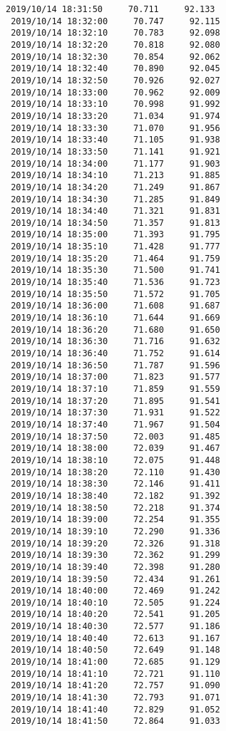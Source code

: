 \documentclass[11pt]{article}
\begin{document}
\begin{Verbatim}[commandchars=\\\{\}]
 2019/10/14 18:31:50     70.711     92.133
 2019/10/14 18:32:00     70.747     92.115
 2019/10/14 18:32:10     70.783     92.098
 2019/10/14 18:32:20     70.818     92.080
 2019/10/14 18:32:30     70.854     92.062
 2019/10/14 18:32:40     70.890     92.045
 2019/10/14 18:32:50     70.926     92.027
 2019/10/14 18:33:00     70.962     92.009
 2019/10/14 18:33:10     70.998     91.992
 2019/10/14 18:33:20     71.034     91.974
 2019/10/14 18:33:30     71.070     91.956
 2019/10/14 18:33:40     71.105     91.938
 2019/10/14 18:33:50     71.141     91.921
 2019/10/14 18:34:00     71.177     91.903
 2019/10/14 18:34:10     71.213     91.885
 2019/10/14 18:34:20     71.249     91.867
 2019/10/14 18:34:30     71.285     91.849
 2019/10/14 18:34:40     71.321     91.831
 2019/10/14 18:34:50     71.357     91.813
 2019/10/14 18:35:00     71.393     91.795
 2019/10/14 18:35:10     71.428     91.777
 2019/10/14 18:35:20     71.464     91.759
 2019/10/14 18:35:30     71.500     91.741
 2019/10/14 18:35:40     71.536     91.723
 2019/10/14 18:35:50     71.572     91.705
 2019/10/14 18:36:00     71.608     91.687
 2019/10/14 18:36:10     71.644     91.669
 2019/10/14 18:36:20     71.680     91.650
 2019/10/14 18:36:30     71.716     91.632
 2019/10/14 18:36:40     71.752     91.614
 2019/10/14 18:36:50     71.787     91.596
 2019/10/14 18:37:00     71.823     91.577
 2019/10/14 18:37:10     71.859     91.559
 2019/10/14 18:37:20     71.895     91.541
 2019/10/14 18:37:30     71.931     91.522
 2019/10/14 18:37:40     71.967     91.504
 2019/10/14 18:37:50     72.003     91.485
 2019/10/14 18:38:00     72.039     91.467
 2019/10/14 18:38:10     72.075     91.448
 2019/10/14 18:38:20     72.110     91.430
 2019/10/14 18:38:30     72.146     91.411
 2019/10/14 18:38:40     72.182     91.392
 2019/10/14 18:38:50     72.218     91.374
 2019/10/14 18:39:00     72.254     91.355
 2019/10/14 18:39:10     72.290     91.336
 2019/10/14 18:39:20     72.326     91.318
 2019/10/14 18:39:30     72.362     91.299
 2019/10/14 18:39:40     72.398     91.280
 2019/10/14 18:39:50     72.434     91.261
 2019/10/14 18:40:00     72.469     91.242
 2019/10/14 18:40:10     72.505     91.224
 2019/10/14 18:40:20     72.541     91.205
 2019/10/14 18:40:30     72.577     91.186
 2019/10/14 18:40:40     72.613     91.167
 2019/10/14 18:40:50     72.649     91.148
 2019/10/14 18:41:00     72.685     91.129
 2019/10/14 18:41:10     72.721     91.110
 2019/10/14 18:41:20     72.757     91.090
 2019/10/14 18:41:30     72.793     91.071
 2019/10/14 18:41:40     72.829     91.052
 2019/10/14 18:41:50     72.864     91.033

\end{Verbatim}
\end{document}
